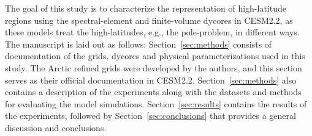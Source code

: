 \documentclass[draft]{agujournal2019}
\begin{document}
The goal of this study is to characterize the representation of high-latitude regions using the spectral-element and finite-volume dycores in CESM2.2, as these models treat the high-latitudes, e.g., the pole-problem, in different ways. The manuscript is laid out as follows: Section~\ref{sec:methods} consists of documentation of the grids, dycores and physical parameterizations used in this study. The Arctic refined grids were developed by the authors, and this section serves as their official documentation in CESM2.2. Section~\ref{sec:methods} also contains a description of the experiments along with the datasets and methods for evaluating the model simulations. Section~\ref{sec:results} contains the results of the experiments, followed by Section~\ref{sec:conclusions} that provides a general discussion and conclusions.
\end{document}
